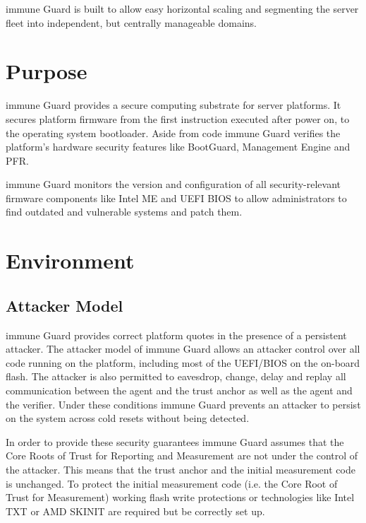 \documentclass[a4paper,oneside,10pt,extrafontsizes]{memoir}
\newcommand\todo[1]{\textcolor{red}{TODO: #1\newline}}
\begin{document}
immune Guard is built to allow easy horizontal scaling and segmenting the
server fleet into independent, but centrally manageable domains. 

\section{Purpose}

immune Guard provides a secure computing substrate for server platforms. It
secures platform firmware from the first instruction executed after power on,
to the operating system bootloader. Aside from code immune Guard verifies
the platform's hardware security features like BootGuard, Management Engine and
PFR. 

immune Guard monitors the version and configuration of all security-relevant
firmware components like Intel ME and UEFI BIOS to allow administrators to find
outdated and vulnerable systems and patch them.





\section{Environment}

\subsection*{Attacker Model}

immune Guard provides correct platform quotes in the presence of a
persistent attacker. The attacker model of immune Guard allows an attacker
control over all code running on the platform, including most of the UEFI/BIOS on
the on-board flash. The attacker is also permitted to eavesdrop, change, delay
and replay all communication between the agent and the trust anchor as well as
the agent and the verifier. Under these conditions immune Guard prevents an
attacker to persist on the system across cold resets without being detected. 

In order to provide these security guarantees immune Guard assumes that the
Core Roots of Trust for Reporting and Measurement are not under the control of
the attacker. This means that the trust anchor and the initial measurement code
is unchanged. To protect the initial measurement code (i.e. the Core Root of
Trust for Measurement) working flash write protections or technologies like
Intel TXT or AMD SKINIT are required but be correctly set up.
\end{document}
